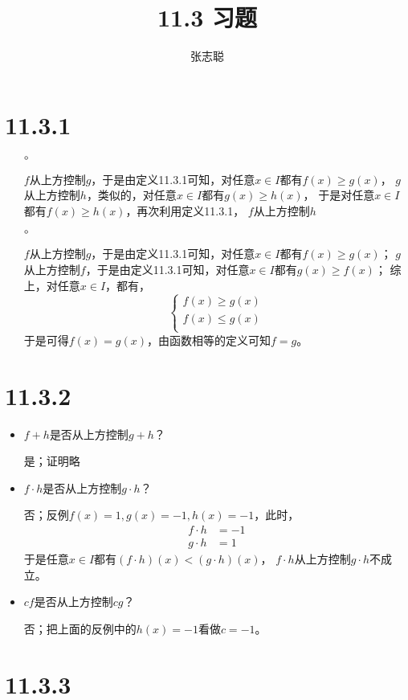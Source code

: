 \documentclass{article}
\begin{document}
\title{11.3 习题}
\author{张志聪}
\maketitle

\section*{11.3.1}

\begin{itemize}
  \item[$\circ$]

        $f$从上方控制$g$，于是由定义11.3.1可知，对任意$x \in I$都有$f(x) \geq g(x)$，
        $g$从上方控制$h$，类似的，对任意$x \in I$都有$g(x) \geq h(x)$，
        于是对任意$x \in I$都有$f(x) \geq h(x)$，再次利用定义11.3.1，
        $f$从上方控制$h$

  \item[$\circ$]

        $f$从上方控制$g$，于是由定义11.3.1可知，对任意$x \in I$都有$f(x) \geq g(x)$；
        $g$从上方控制$f$，于是由定义11.3.1可知，对任意$x \in I$都有$g(x) \geq f(x)$；
        综上，对任意$x \in I$，都有，
        \begin{equation*}
          \begin{cases*}
            f(x) \geq g(x) \\
            f(x) \leq g(x) \\
          \end{cases*}
        \end{equation*}
        于是可得$f(x) = g(x)$，由函数相等的定义可知$f=g$。

\end{itemize}

\section*{11.3.2}

\begin{itemize}
  \item $f + h$是否从上方控制$g + h$？

        是；证明略

  \item $f \cdot h$是否从上方控制$g \cdot h$？

        否；反例$f(x) = 1, g(x) = -1, h(x) = -1$，此时，
        \begin{align*}
          f \cdot h & = -1 \\
          g \cdot h & = 1
        \end{align*}
        于是任意$x \in I$都有$(f \cdot h)(x) < (g \cdot h)(x)$，
        $f \cdot h$从上方控制$g \cdot h$不成立。

  \item $cf$是否从上方控制$cg$？

        否；把上面的反例中的$h(x)=-1$看做$c=-1$。

\end{itemize}

\section*{11.3.3}
\end{document}
